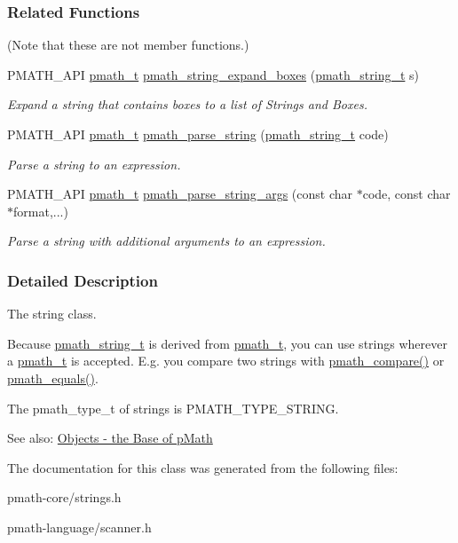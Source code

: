 \subsubsection*{Related Functions}
(Note that these are not member functions.) \begin{CompactItemize}
\item 
PMATH\_\-API \hyperlink{classpmath__t}{pmath\_\-t} \hyperlink{group__parser_g78a874e9d0b6aca112bad336d319a1c1}{pmath\_\-string\_\-expand\_\-boxes} (\hyperlink{classpmath__string__t}{pmath\_\-string\_\-t} s)
\begin{CompactList}\small\item\em Expand a string that contains boxes to a list of Strings and Boxes. \item\end{CompactList}\item 
PMATH\_\-API \hyperlink{classpmath__t}{pmath\_\-t} \hyperlink{group__parser_g30c73f2fbcd116125cb5befd26b35ec4}{pmath\_\-parse\_\-string} (\hyperlink{classpmath__string__t}{pmath\_\-string\_\-t} code)
\begin{CompactList}\small\item\em Parse a string to an expression. \item\end{CompactList}\item 
PMATH\_\-API \hyperlink{classpmath__t}{pmath\_\-t} \hyperlink{group__parser_gac02e250fcd91e4fc03f0f7e8a6dd571}{pmath\_\-parse\_\-string\_\-args} (const char $\ast$code, const char $\ast$format,...)
\begin{CompactList}\small\item\em Parse a string with additional arguments to an expression. \item\end{CompactList}\end{CompactItemize}


\subsubsection{Detailed Description}
The string class. 

Because \hyperlink{classpmath__string__t}{pmath\_\-string\_\-t} is derived from \hyperlink{classpmath__t}{pmath\_\-t}, you can use strings wherever a \hyperlink{classpmath__t}{pmath\_\-t} is accepted. E.g. you compare two strings with \hyperlink{group__objects_gc57589e08f5b3eed28e724c646503735}{pmath\_\-compare()} or \hyperlink{group__objects_g6475af7f7c85777392e38c570ac07892}{pmath\_\-equals()}.

The pmath\_\-type\_\-t of strings is PMATH\_\-TYPE\_\-STRING.

\begin{Desc}
\item[See also:]\hyperlink{group__objects}{Objects - the Base of pMath} \end{Desc}


The documentation for this class was generated from the following files:\begin{CompactItemize}
\item 
pmath-core/strings.h\item 
pmath-language/scanner.h\end{CompactItemize}
